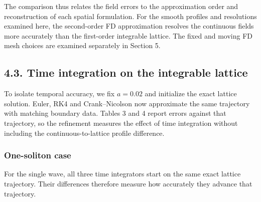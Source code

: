 \documentclass[11pt,a4paper]{article}
\begin{document}
The comparison thus relates the field errors to the approximation order and reconstruction of each spatial formulation. For the smooth profiles and resolutions examined here, the second-order FD approximation resolves the continuous fields more accurately than the first-order integrable lattice. The fixed and moving FD mesh choices are examined separately in Section 5.

\FloatBarrier
\subsection*{4.3. Time integration on the integrable lattice}

To isolate temporal accuracy, we fix \(a=0.02\) and initialize the exact lattice solution. Euler, RK4 and Crank–Nicolson now approximate the same trajectory with matching boundary data. Tables 3 and 4 report errors against that trajectory, so the refinement measures the effect of time integration without including the continuous-to-lattice profile difference.

\subsubsection*{One-soliton case}

For the single wave, all three time integrators start on the same exact lattice trajectory. Their differences therefore measure how accurately they advance that trajectory.
\end{document}
